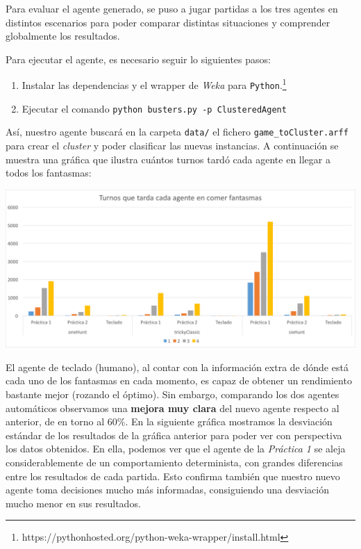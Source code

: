 \documentclass[12pt]{article}
\begin{document}
Para evaluar el agente generado, se puso a jugar partidas a los tres agentes en distintos escenarios para poder comparar distintas situaciones y comprender globalmente los resultados.

Para ejecutar el agente, es necesario seguir lo siguientes pasos:
\begin{enumerate}
    \item Instalar las dependencias y el wrapper de \textit{Weka} para \texttt{Python}.\footnote{https://pythonhosted.org/python-weka-wrapper/install.html}
    \item Ejecutar el comando \texttt{python busters.py -p ClusteredAgent}
\end{enumerate}

Así, nuestro agente buscará en la carpeta \texttt{data/} el fichero \texttt{game\_toCluster.arff} para crear el \textit{cluster} y poder clasificar las nuevas instancias. A continuación se muestra una gráfica que ilustra cuántos turnos tardó cada agente en llegar a todos los fantasmas:

\begin{center}
    \includegraphics[width=16.7cm]{performance}
\end{center}

El agente de teclado (humano), al contar con la información extra de dónde está cada uno de los fantasmas en cada momento, es capaz de obtener un rendimiento bastante mejor (rozando el óptimo). Sin embargo, comparando los dos agentes automáticos observamos una \textbf{mejora muy clara} del nuevo agente respecto al anterior, de en torno al 60\%. En la siguiente gráfica mostramos la desviación estándar de los resultados de la gráfica anterior para poder ver con perspectiva los datos obtenidos. En ella, podemos ver que el agente de la \textit{Práctica 1} se aleja considerablemente de un comportamiento determinista, con grandes diferencias entre los resultados de cada partida. Esto confirma también que nuestro nuevo agente toma decisiones mucho más informadas, consiguiendo una desviación mucho menor en sus resultados.
\end{document}
